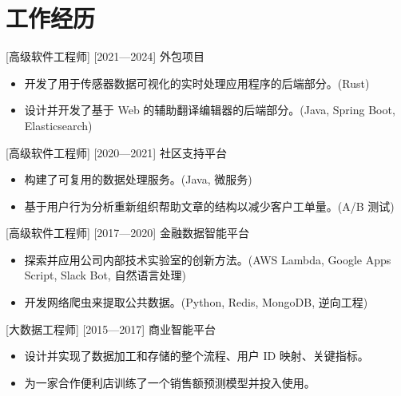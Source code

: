 \documentclass{resume}
\begin{document}


\ResumeTitle

\section{工作经历}
[高级软件工程师]
[2021—2024]
外包项目
\begin{itemize}
  \item 开发了用于传感器数据可视化的实时处理应用程序的后端部分。(Rust)
  \item 设计并开发了基于 Web 的辅助翻译编辑器的后端部分。(Java, Spring Boot, Elasticsearch)
\end{itemize}

[高级软件工程师]
[2020—2021]
社区支持平台
\begin{itemize}
  \item 构建了可复用的数据处理服务。(Java, 微服务)
  \item 基于用户行为分析重新组织帮助文章的结构以减少客户工单量。(A/B 测试)
\end{itemize}

[高级软件工程师]
[2017—2020]
金融数据智能平台
\begin{itemize}
  \item 探索并应用公司内部技术实验室的创新方法。(AWS Lambda, Google Apps Script, Slack Bot, 自然语言处理)
  \item 开发网络爬虫来提取公共数据。(Python, Redis, MongoDB, 逆向工程)
\end{itemize}

[大数据工程师]
[2015—2017]
商业智能平台
\begin{itemize}
  \item 设计并实现了数据加工和存储的整个流程、用户 ID 映射、关键指标。
  \item 为一家合作便利店训练了一个销售额预测模型并投入使用。
\end{itemize}
\end{document}
